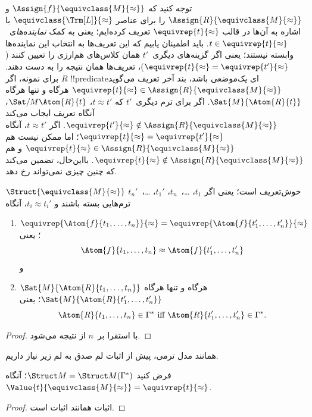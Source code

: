 \documentclass[../../../include/open-logic-section]{subfiles}
\begin{document}
\begin{explain}
توجه کنید که $\Assign{f}{\equivclass{M}{\approx}}$ و
$\Assign{R}{\equivclass{M}{\approx}}$ را برای عناصر
$\equivclass{\Trm[L]}{\approx}$ با اشاره به آن‌ها در قالب
$\equivrep{t}{\approx}$ تعریف کرده‌ایم؛ یعنی به کمک
\emph{نماینده‌ها}ی~$t \in \equivrep{t}{\approx}$. باید اطمینان یابیم
که این تعریف‌ها به انتخاب این نماینده‌ها وابسته نیستند؛ یعنی اگر
گزینه‌های دیگری~$t'$ همان کلاس‌های هم‌ارزی را تعیین کنند
($\equivrep{t}{\approx} = \equivrep{t'}{\approx}$)، تعریف‌ها همان نتیجه
را به دست دهند. برای نمونه، اگر $R$ !!{predicate}ای یک‌موضعی باشد، بند
آخر تعریف می‌گوید $\equivrep{t}{\approx} \in
\Assign{R}{\equivclass{M}{\approx}}$ هرگاه و تنها هرگاه
$\Sat{M}{\Atom{R}{t}}$. اگر برای ترم دیگری~$t'$ که $t \approx t'$،
$\Sat/{M}{\Atom{R}{t}}$، آنگاه تعریف ایجاب می‌کند
$\equivrep{t'}{\approx} \notin \Assign{R}{\equivclass{M}{\approx}}$.
اگر $t \approx t'$، آنگاه $\equivrep{t}{\approx} =
\equivrep{t'}{\approx}$؛ اما ممکن نیست هم
$\equivrep{t}{\approx} \in \Assign{R}{\equivclass{M}{\approx}}$ و هم
$\equivrep{t}{\approx} \notin \Assign{R}{\equivclass{M}{\approx}}$.
بااین‌حال،  تضمین می‌کند که چنین چیزی نمی‌تواند
رخ دهد.
\end{explain}

\begin{prop}
$\Struct{\equivclass{M}{\approx}}$ خوش‌تعریف است؛ یعنی اگر $t_1$،
  \dots،~$t_n$، $t_1'$، \dots،~$t_n'$ ترم‌هایی بسته باشند و
  $t_i \approx t_i'$، آنگاه
\begin{enumerate}
\item $\equivrep{\Atom{f}{t_1,\dots, t_n}}{\approx} =
    \equivrep{\Atom{f}{t_1',\dots, t_n'}}{\approx}$؛ یعنی
  \[
  \Atom{f}{t_1,\dots, t_n} \approx \Atom{f}{t_1',\dots, t_n'}
  \]
  و
\item $\Sat{M}{\Atom{R}{t_1,\dots, t_n}}$ هرگاه و تنها هرگاه
  $\Sat{M}{\Atom{R}{t_1',\dots, t_n'}}$؛ یعنی
  \[
    \Atom{R}{t_1,\dots, t_n} \in \Gamma^* \text{ iff }
    \Atom{R}{t_1',\dots, t_n'} \in \Gamma^*.
  \]
\end{enumerate}
\end{prop}

\begin{proof}
با استقرا بر~$n$ از  نتیجه می‌شود.
\end{proof}

همانند مدل ترمی، پیش از اثبات لم صدق به لم زیر نیاز داریم.

\begin{lem}
 فرض کنید
$\Struct M = \Struct M (\Gamma^*)$؛ آنگاه
$\Value{t}{\equivclass{M}{\approx}} = \equivrep{t} {\approx}$.
\end{lem}
\begin{proof}
اثبات همانند اثبات  است.
\end{proof}
\end{document}
